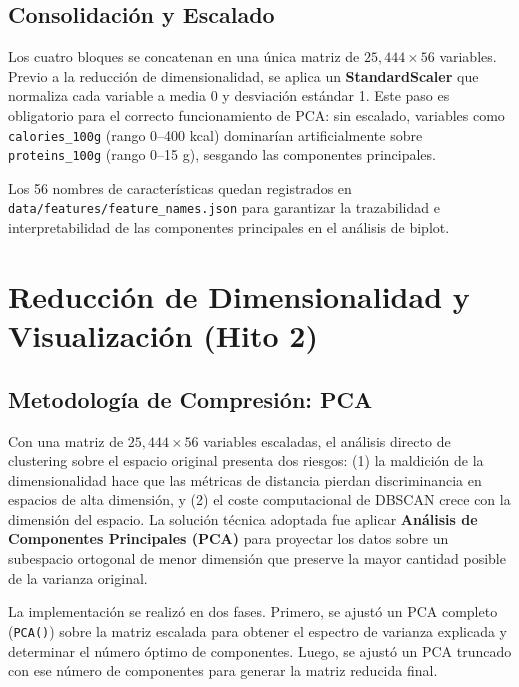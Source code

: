 \documentclass[12pt,a4paper]{article}
\newcommand{\code}[1]{\texttt{\small #1}}
\begin{document}
\subsection{Consolidación y Escalado}

Los cuatro bloques se concatenan en una única matriz de $25{,}444 \times 56$ variables. Previo a la reducción de dimensionalidad, se aplica un \textbf{StandardScaler} que normaliza cada variable a media 0 y desviación estándar 1. Este paso es obligatorio para el correcto funcionamiento de PCA: sin escalado, variables como \code{calories\_100g} (rango 0--400 kcal) dominarían artificialmente sobre \code{proteins\_100g} (rango 0--15 g), sesgando las componentes principales.

Los 56 nombres de características quedan registrados en \code{data/features/feature\_names.json} para garantizar la trazabilidad e interpretabilidad de las componentes principales en el análisis de biplot.

\section{Reducción de Dimensionalidad y Visualización (Hito 2)}

\subsection{Metodología de Compresión: PCA}

Con una matriz de $25{,}444 \times 56$ variables escaladas, el análisis directo de clustering sobre el espacio original presenta dos riesgos: (1) la maldición de la dimensionalidad hace que las métricas de distancia pierdan discriminancia en espacios de alta dimensión, y (2) el coste computacional de DBSCAN crece con la dimensión del espacio. La solución técnica adoptada fue aplicar \textbf{Análisis de Componentes Principales (PCA)} para proyectar los datos sobre un subespacio ortogonal de menor dimensión que preserve la mayor cantidad posible de la varianza original.

La implementación se realizó en dos fases. Primero, se ajustó un PCA completo (\code{PCA()}) sobre la matriz escalada para obtener el espectro de varianza explicada y determinar el número óptimo de componentes. Luego, se ajustó un PCA truncado con ese número de componentes para generar la matriz reducida final.
\end{document}
